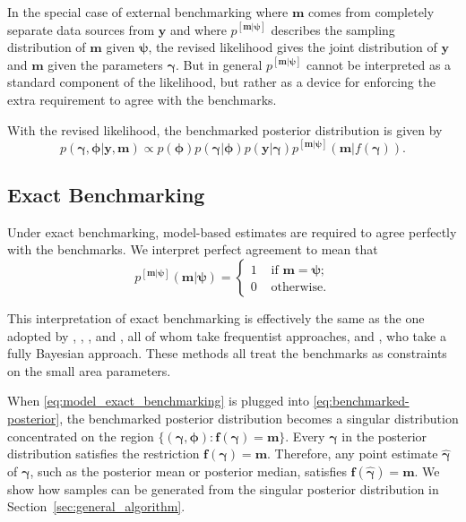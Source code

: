 \documentclass[12pt]{article}
\begin{document}
In the special case of external benchmarking where $\bm{m}$ comes from completely separate data sources from $\bm{y}$ and where $p^{[\bm{m}|\bm{\psi}]}$ describes the sampling distribution of $\bm{m}$ given $\bm{\psi}$, the revised likelihood gives the joint distribution of $\bm{y}$ and $\bm{m}$ given the parameters $\bm{\gamma}$.  But in general $p^{[\bm{m}|\bm{\psi}]}$ cannot be interpreted as a standard component of the likelihood, but rather as a device for enforcing the extra requirement to agree with the benchmarks.

 With the revised likelihood, the benchmarked posterior distribution is given by
\begin{equation}
  p(\bm{\gamma},\bm{\phi}|\bm{y},\bm{m})\propto p(\bm{\phi}) p(\bm{\gamma} | \bm{\phi}) p(\bm{y} | \bm{\gamma})p^{[\bm{m}|\bm{\psi}]}(\bm{m}|f(\bm{\gamma})).\label{eq:benchmarked-posterior}
\end{equation}

\subsection{Exact Benchmarking}\label{sec:exact}

Under exact benchmarking, model-based estimates are required to agree perfectly with the benchmarks.  We interpret perfect agreement to mean that
\begin{equation}
  p^{[\bm{m}|\bm{\psi}]}(\bm{m} | \bm{\psi}) = \begin{cases} 1 & \text{ if } \bm{m} = \bm{\psi}\text{;} \\ 0 & \text{ otherwise.} \end{cases}
  \label{eq:model_exact_benchmarking}
\end{equation}


This interpretation of exact benchmarking is effectively the same as the one adopted by \citet{pfeffermann1991some}, \citet{pfeffermann2006small}, \citet{fabrizi2012constrained}, and \cite{pfeffermann2014single}, all of whom take frequentist approaches, and \citet{nandram2011constraint}, who take a fully Bayesian approach.  These methods all treat the benchmarks as constraints on the small area parameters.

When \eqref{eq:model_exact_benchmarking} is plugged into \eqref{eq:benchmarked-posterior}, the benchmarked posterior distribution becomes a singular distribution concentrated on the region $\{(\bm{\gamma},\bm{\phi}): \bm{f}(\bm{\gamma})=\bm{m}\}$. Every $\bm{\gamma}$ in the posterior distribution satisfies the restriction $\bm{f}(\bm{\gamma}) = \bm{m}$. Therefore, any point estimate $\hat{\bm{\gamma}}$ of $\bm{\gamma}$, such as the posterior mean or posterior median, satisfies $\bm{f}(\hat{\bm{\gamma}})=\bm{m}$. We show how samples can be generated from the singular posterior distribution in Section~\ref{sec:general_algorithm}.
\end{document}
